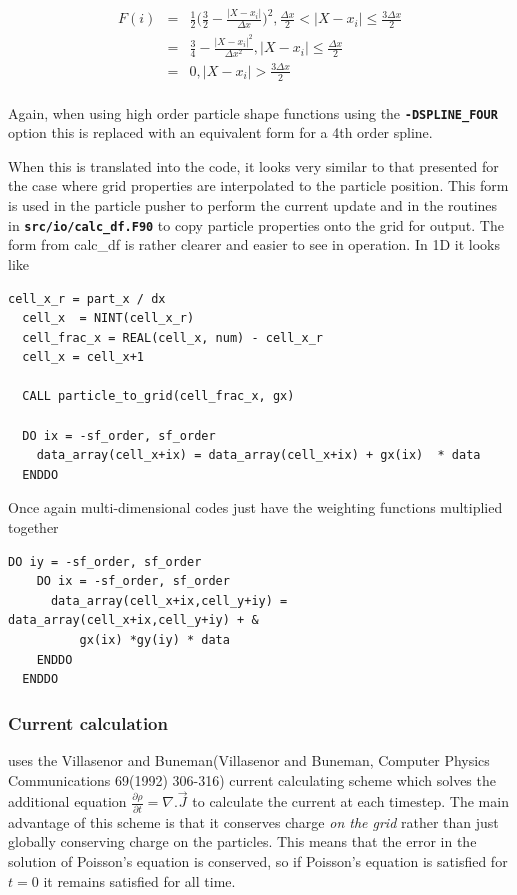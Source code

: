 \documentclass[12pt,a4paper]{article}
\newcommand{\simpleboxverbatim}{\begin{Verbatim}[obeytabs=true,frame=single,
  framerule=0.5mm,rulecolor=\color{warwickmid},formatcom=\color{black}]}
\newcommand{\inlinecode}[1]{{\color{warwickred} \bf\texttt{#1}}}
\newcommand{\EPOCH}{{\color{warwickdark}\fontfamily{phv}\selectfont{EPOCH}}}
\begin{document}
\begin{eqnarray*}
  F(i) &=& \frac{1}{2} \bigl(\frac{3}{2} - \frac{|X - x_i|}{\Delta x} \bigr)^2, \frac{\Delta x}{2} < |X-x_i| \le \frac{3 \Delta x}{2}\\
  &=& \frac{3}{4} - \frac{|X-x_i|^2}{\Delta x^2}, |X-x_i| \le \frac{\Delta x}{2}\\
  &=& 0, |X-x_i| > \frac{3 \Delta x}{2}\\
\end{eqnarray*}

Again, when using high order particle shape functions using the
\inlinecode{-DSPLINE\_FOUR} option this is replaced with an equivalent form for
a 4th order spline.

When this is translated into the code, it looks very similar to that presented
for the case where grid properties are interpolated to the particle
position. This form is used in the particle pusher to perform the current
update and in the routines in \inlinecode{src/io/calc\_df.F90} to copy particle
properties onto the grid for output. The form from calc\_df is rather clearer
and easier to see in operation. In 1D it looks like

\simpleboxverbatim
  cell_x_r = part_x / dx
  cell_x  = NINT(cell_x_r)
  cell_frac_x = REAL(cell_x, num) - cell_x_r
  cell_x = cell_x+1

  CALL particle_to_grid(cell_frac_x, gx)

  DO ix = -sf_order, sf_order
    data_array(cell_x+ix) = data_array(cell_x+ix) + gx(ix)  * data
  ENDDO
\end{Verbatim}

Once again multi-dimensional codes just have the weighting functions multiplied
together
\simpleboxverbatim
  DO iy = -sf_order, sf_order
    DO ix = -sf_order, sf_order
      data_array(cell_x+ix,cell_y+iy) = data_array(cell_x+ix,cell_y+iy) + &
          gx(ix) *gy(iy) * data
    ENDDO
  ENDDO
\end{Verbatim}

\subsubsection{Current calculation}
{\EPOCH} uses the Villasenor and Buneman(Villasenor and Buneman, Computer Physics
Communications 69(1992) 306-316) current calculating scheme which solves the
additional equation $\frac{\partial \rho}{\partial t} = \nabla . \vec{J}$ to
calculate the current at each timestep. The main advantage of this scheme is
that it conserves charge {\it on the grid} rather than just globally conserving
charge on the particles. This means that the error in the solution of Poisson's
equation is conserved, so if Poisson's equation is satisfied for $t=0$ it
remains satisfied for all time.\\
\end{document}
